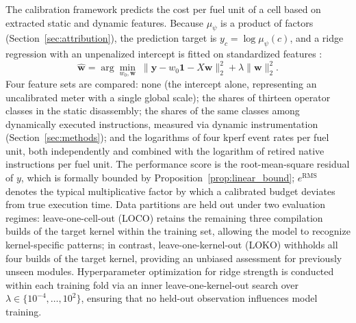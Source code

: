 \documentclass{ws-jcsc}
\begin{document}
The calibration framework predicts the cost per fuel unit of a cell based on extracted static and dynamic features. Because $\mu_\psi$ is a product of factors (Section~\ref{sec:attribution}), the prediction target is $y_c=\log\mu_\psi(c)$, and a ridge regression with an unpenalized intercept is fitted on standardized features \cite{hoerl1970ridge}:
\begin{equation}
\hat{\mathbf{w}} = \arg\min_{w_0,\mathbf{w}}\; \lVert \mathbf{y} - w_0\mathbf{1} - X \mathbf{w} \rVert_2^2 + \lambda \lVert \mathbf{w} \rVert_2^2 .
\end{equation}
Four feature sets are compared: none (the intercept alone, representing an uncalibrated meter with a single global scale); the shares of thirteen operator classes in the static disassembly; the shares of the same classes among dynamically executed instructions, measured via dynamic instrumentation (Section~\ref{sec:methods}); and the logarithms of four kperf event rates per fuel unit, both independently and combined with the logarithm of retired native instructions per fuel unit. The performance score is the root-mean-square residual of $y$, which is formally bounded by Proposition~\ref{prop:linear_bound}; $e^{\mathrm{RMS}}$ denotes the typical multiplicative factor by which a calibrated budget deviates from true execution time. Data partitions are held out under two evaluation regimes: leave-one-cell-out (LOCO) retains the remaining three compilation builds of the target kernel within the training set, allowing the model to recognize kernel-specific patterns; in contrast, leave-one-kernel-out (LOKO) withholds all four builds of the target kernel, providing an unbiased assessment for previously unseen modules. Hyperparameter optimization for ridge strength is conducted within each training fold via an inner leave-one-kernel-out search over $\lambda\in\{10^{-4},\dots,10^{2}\}$, ensuring that no held-out observation influences model training.
\end{document}
